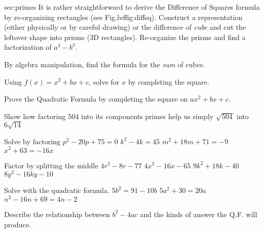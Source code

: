 
\begin{exercises}{sec:primes}
\prob[AA06CubeDifference] It is rather straightforward to derive the Difference of Squares formula by re-organizing rectangles (see Fig.\~ref{fig:diffsq}).  Construct a representation (either physically or by careful drawing) or the difference of \emph{cube} and cut the leftover shape into prisms (3D rectangles).  Re-organize the prisms and find a factorization of $a^3-b^3$.



\prob[AA06CubeSum] By algebra manipulation, find the formula for the \emph{sum} of cubes.


\prob[AA06CS] Using $f(x) = x^2 + bx + c$, solve for $x$ by completing the square.


\prob[AA06QF] Prove the Quadratic Formula by completing the square on $ax^2+bx+c$.


\prob[AA06Root] Show how  factoring 504 into its components primes help us simply $\sqrt{504}$ into $6\sqrt{14}$


\prob[AA06Factor]  Solve by factoring
\subprob $p^2-20p+75=0$
\subprob $k^2-4k=45$
\subprob $m^2+18m+71=-9$
\subprob $x^2+63=-16x$


\prob[AA06Split]  Factor by splitting the middle
\subprob $4r^2-8r-77$
\subprob $4x^2-16x-65$
\subprob $9k^2+18k-40$
\subprob $8y^2-16ky-10$



\prob[AA06Hard] Solve with the quadratic formula.  
\subprob $5b^2=91-10b$
\subprob $5a^2+30=20a$
\subprob $n^2-16n+69=4n-2$

\prob[AA06Disc]  Describe the relationship between $b^2-4ac$ and the kinds of answer the Q.F. will produce.

\end{exercises}